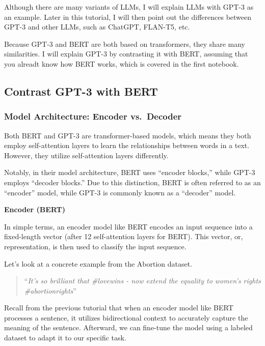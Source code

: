 \documentclass[11pt]{article}
\begin{document}
    Although there are many variants of LLMs, I will explain LLMs with GPT-3
as an example. Later in this tutorial, I will then point out the
differences between GPT-3 and other LLMs, such as ChatGPT, FLAN-T5, etc.

    Because GPT-3 and BERT are both based on transformers, they share many
similarities. I will explain GPT-3 by contrasting it with BERT, assuming
that you alreadt know how BERT works, which is covered in the first
notebook.

    \hypertarget{contrast-gpt-3-with-bert}{%
\subsection{Contrast GPT-3 with BERT}\label{contrast-gpt-3-with-bert}}

    \hypertarget{model-architecture-encoder-vs.-decoder}{%
\subsubsection{Model Architecture: Encoder
vs.~Decoder}\label{model-architecture-encoder-vs.-decoder}}

    Both BERT and GPT-3 are transformer-based models, which means they both
employ self-attention layers to learn the relationships between words in
a text. However, they utilize self-attention layers differently.

Notably, in their model architecture, BERT uses ``encoder blocks,''
while GPT-3 employs ``decoder blocks.'' Due to this distinction, BERT is
often referred to as an ``encoder'' model, while GPT-3 is commonly known
as a ``decoder'' model.

    \textbf{Encoder (BERT)}

In simple terms, an encoder model like BERT encodes an input sequence
into a fixed-length vector (after 12 self-attention layers for BERT).
This vector, or, representation, is then used to classify the input
sequence.

    Let's look at a concrete example from the Abortion dataset.

\begin{quote}
``\emph{It's so brilliant that \#lovewins - now extend the equality to
women's rights \#abortionrights}''
\end{quote}

    Recall from the previous tutorial that when an encoder model like BERT
processes a sentence, it utilizes bidirectional context to accurately
capture the meaning of the sentence. Afterward, we can fine-tune the
model using a labeled dataset to adapt it to our specific task.
\end{document}
